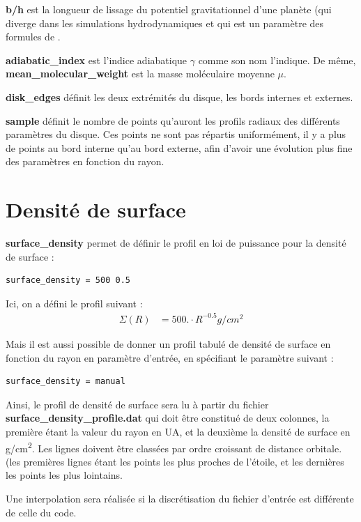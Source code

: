 \textbf{b/h} est la longueur de lissage du potentiel gravitationnel d'une planète (qui diverge dans les simulations hydrodynamiques et qui est un paramètre des formules de \cite{paardekooper2011torque}.

\textbf{adiabatic\_index} est l'indice adiabatique $\gamma$ comme son nom l'indique. De même, \textbf{mean\_molecular\_weight} est la masse moléculaire moyenne $\mu$.

\textbf{disk\_edges} définit les deux extrémités du disque, les bords internes et externes.

\textbf{sample} définit le nombre de points qu'auront les profils radiaux des différents paramètres du disque. Ces points ne sont pas répartis uniformément, il y a plus de points au bord interne qu'au bord externe, afin d'avoir une évolution plus fine des paramètres en fonction du rayon.

\section{Densité de surface}
\textbf{surface\_density} permet de définir le profil en loi de puissance pour la densité de surface : 
\begin{verbatim}
surface_density = 500 0.5
\end{verbatim}
Ici, on a défini le profil suivant : 
\begin{align*}
\Sigma(R) &= 500. \cdot R^{-0.5} \unit{g/cm^2}
\end{align*}

Mais il est aussi possible de donner un profil tabulé de densité de surface en fonction du rayon en paramètre d'entrée, en spécifiant le paramètre suivant : 
\begin{verbatim}
surface_density = manual
\end{verbatim}
Ainsi, le profil de densité de surface sera lu à partir du fichier \textbf{surface\_density\_profile.dat} qui doit être constitué de deux colonnes, la première étant la valeur du rayon en \unit{UA}, et la deuxième la densité de surface en \unit{g/cm^2}. Les lignes doivent être classées par ordre croissant de distance orbitale. (les premières lignes étant les points les plus proches de l'étoile, et les dernières les points les plus lointains. 

\begin{remarque}
Une interpolation sera réalisée si la discrétisation du fichier d'entrée est différente de celle du code.
\end{remarque}

